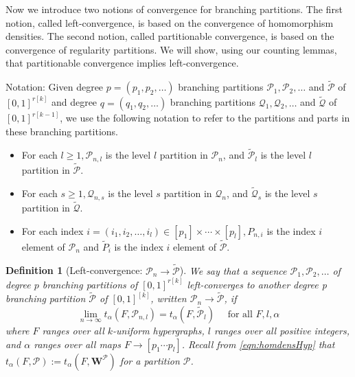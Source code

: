 \documentclass[11pt]{article}
\newtheorem{definition}[theorem]{Definition}
\begin{document}
Now we introduce two notions of convergence for branching partitions. The first notion, called left-convergence, is based on the convergence of homomorphism densities. The second notion, called partitionable convergence, is based on the convergence of regularity partitions. We will show, using our counting lemmas, that partitionable convergence implies left-convergence.

Notation: Given degree $p=\left(p_1, p_2, \ldots\right)$ branching partitions $\mathscr{P}_1, \mathscr{P}_2, \ldots$ and $\tilde{\mathscr{P}}$ of $[0,1]^{r[k]}$ and degree $q=\left(q_1, q_2, \ldots\right)$ branching partitions $\mathscr{Q}_1, \mathscr{Q}_2, \ldots$ and $\tilde{\mathscr{Q}}$ of $[0,1]^{r[k-1]}$, we use the following notation to refer to the partitions and parts in these branching partitions.
\begin{itemize}
\item For each $l \geq 1, \mathcal{P}_{n, l}$ is the level $l$ partition in $\mathscr{P}_n$, and $\tilde{\mathcal{P}}_l$ is the level $l$ partition in $\tilde{\mathscr{P}}$.
\item For each $s \geq 1, \mathcal{Q}_{n, s}$ is the level $s$ partition in $\mathscr{Q}_n$, and $\tilde{\mathcal{Q}}_s$ is the level $s$ partition in $\tilde{\mathscr{Q}}$.
\item For each index $i=\left(i_1, i_2, \ldots, i_l\right) \in\left[p_1\right] \times \cdots \times\left[p_l\right], P_{n, i}$ is the index $i$ element of $\mathscr{P}_n$ and $\tilde{P}_i$ is the index $i$ element of $\tilde{\mathscr{P}}$.
\end{itemize}

\begin{definition}
[Left-convergence: $\mathscr{P}_n \rightarrow \tilde{\mathscr{P}}$] We say that a sequence $\mathscr{P}_1, \mathscr{P}_2, \ldots$ of degree $p$ branching partitions of $[0,1]^{r[k]}$ left-converges to another degree p branching partition $\tilde{\mathscr{P}}$ of $[0,1]^{[k]}$, written $\mathscr{P}_n \rightarrow \tilde{\mathscr{P}}$, if
$$
\lim _{n \rightarrow \infty} t_\alpha\left(F, \mathcal{P}_{n, l}\right)=t_\alpha\left(F, \tilde{\mathcal{P}}_l\right) \quad \text { for all } F, l, \alpha
$$
where $F$ ranges over all $k$-uniform hypergraphs, $l$ ranges over all positive integers, and $\alpha$ ranges over all maps $F \rightarrow\left[p_1 \cdots p_l\right]$. Recall from \eqref{eqn:homdensHyp} that $t_\alpha(F, \mathcal{P}):=t_\alpha\left(F, \mathbf{W}^{\mathcal{P}}\right)$ for a partition $\mathcal{P}$.
\end{definition}
\end{document}
